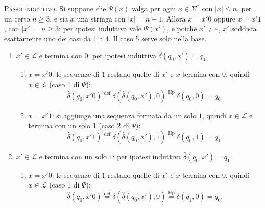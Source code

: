 \documentclass[a4paper, 11pt, oneside]{book}
\theoremstyle{formale}
\begin{document}
    \textsc{Passo induttivo}. Si suppone che $\Psi(x)$ valga per ogni $x \in \Sigma^*$ con
    $|x| \leq n$, per un certo $n \geq 3$, e sia $x$ una stringa con $|x| = n + 1$. Allora
    $x = x'0$ oppure $x = x'1$, con $|x'| = n \geq 3$: per ipotesi induttiva vale
    $\Psi(x')$, e poich\'e $x' \neq \varepsilon$, $x'$ soddisfa esattamente uno dei casi
    da 1 a 4. Il caso 5 serve solo nella base.
    \begin{enumerate}
        \item $x' \in \mathcal{L}$ e termina con $0$: per ipotesi induttiva
            $\hat{\delta}(q_0, x') = q_0$.
            \begin{enumerate}[label=\arabic{enumi}\alph*.]
                \item $x = x'0$: le sequenze di $1$ restano quelle di $x'$ e $x$ termina con $0$, quindi $x \in \mathcal{L}$ (caso 1 di $\Psi$):
                    \begin{equation*}
                        \hat{\delta}(q_0, x'0)
                        \overset{\text{def}}{=} \delta(\hat{\delta}(q_0, x'), 0)
                        \overset{\text{Hp}}{=} \delta(q_0, 0) = q_0.
                    \end{equation*}
                \item $x = x'1$: si aggiunge una sequenza formata da un solo $1$, quindi $x \in \mathcal{L}$ e termina con un solo $1$ (caso 2 di $\Psi$):
                    \begin{equation*}
                        \hat{\delta}(q_0, x'1)
                        \overset{\text{def}}{=} \delta(\hat{\delta}(q_0, x'), 1)
                        \overset{\text{Hp}}{=} \delta(q_0, 1) = q_1.
                    \end{equation*}
            \end{enumerate}
        \item $x' \in \mathcal{L}$ e termina con un solo $1$: per ipotesi induttiva
            $\hat{\delta}(q_0, x') = q_1$.
            \begin{enumerate}[label=\arabic{enumi}\alph*.]
                \item $x = x'0$: le sequenze di $1$ restano quelle di $x'$ e $x$ termina con $0$, quindi $x \in \mathcal{L}$ (caso 1 di $\Psi$):
                    \begin{equation*}
                        \hat{\delta}(q_0, x'0)
                        \overset{\text{def}}{=} \delta(\hat{\delta}(q_0, x'), 0)
                        \overset{\text{Hp}}{=} \delta(q_1, 0) = q_0.
                    \end{equation*}

\end{enumerate}
\end{enumerate}
\end{document}
